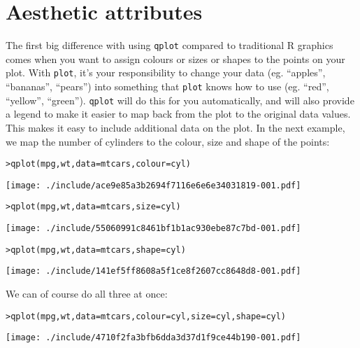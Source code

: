 \section{Aesthetic attributes}\label{sec:aesthetic_attributes}

The first big difference with using {\tt qplot} compared to traditional R graphics comes when you want to assign colours or sizes or shapes to the points on your plot.  With {\tt plot}, it's your responsibility to change your data (eg. ``apples'', ``bananas'', ``pears'') into something that {\tt plot} knows how to use (eg. ``red'', ``yellow'', ``green'').  {\tt qplot} will do this for you automatically, and will also provide a legend to make it easier to map back from the plot to the original data values.  This makes it easy to include additional data on the plot.  In the next example, we map the number of cylinders to the colour, size and shape of the points:

\begin{alltt}
> qplot(mpg, wt, data = mtcars, colour = cyl)
\end{alltt}
\texttt{[image: ./include/ace9e85a3b2694f7116e6e6e34031819-001.pdf]}
\begin{alltt}

> qplot(mpg, wt, data = mtcars, size = cyl)
\end{alltt}
\texttt{[image: ./include/55060991c8461bf1b1ac930ebe87c7bd-001.pdf]}
\begin{alltt}

> qplot(mpg, wt, data = mtcars, shape = cyl)
\end{alltt}
\texttt{[image: ./include/141ef5ff8608a5f1ce8f2607cc8648d8-001.pdf]}
\begin{alltt}

\end{alltt}

We can of course do all three at once:

\begin{alltt}
> qplot(mpg, wt, data = mtcars, colour = cyl, size = cyl, shape = cyl)
\end{alltt}
\texttt{[image: ./include/4710f2fa3bfb6dda3d37d1f9ce44b190-001.pdf]}
\begin{alltt}

\end{alltt}

